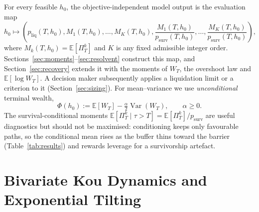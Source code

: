 \documentclass[11pt]{article}
\newcommand{\E}{\mathbb{E}}
\theoremstyle{plain}
\theoremstyle{definition}
\theoremstyle{remark}
\begin{document}
For every feasible $h_0$, the objective-independent model output is the evaluation map
\begin{equation}\label{eq:eval-map}
h_0\longmapsto
\left(
p_{\mathrm{liq}}(T,h_0),
M_1(T,h_0),\ldots,M_K(T,h_0),
\frac{M_1(T,h_0)}{p_{\mathrm{surv}}(T,h_0)},\ldots,
\frac{M_K(T,h_0)}{p_{\mathrm{surv}}(T,h_0)}
\right),
\end{equation}
where $M_k(T,h_0)=\E[\Pi_T^k]$ and $K$ is any fixed admissible integer
order. Sections~\ref{sec:moments}--\ref{sec:resolvent} construct this map, and
Section~\ref{sec:recovery} extends it with the moments of $W_T$, the overshoot law and
$\E[\log W_T]$. A decision maker subsequently applies a liquidation limit or a criterion to it
(Section~\ref{sec:sizing}). For mean--variance we use \emph{unconditional} terminal wealth,
\begin{equation}\label{eq:Phi}
\Phi(h_0):=\E[W_T]-\tfrac{\alpha}{2}\operatorname{Var}(W_T),\qquad \alpha\ge0 .
\end{equation}
The survival-conditional moments $\E[\Pi_T^k\mid\tau>T]=\E[\Pi_T^k]/p_{\mathrm{surv}}$ are useful
diagnostics but should not be maximised: conditioning keeps only favourable paths, so the
conditional mean rises as the buffer thins toward the barrier (Table~\ref{tab:results}) and rewards
leverage for a survivorship artefact.

\section{Bivariate Kou Dynamics and Exponential Tilting}\label{sec:model}
\end{document}
